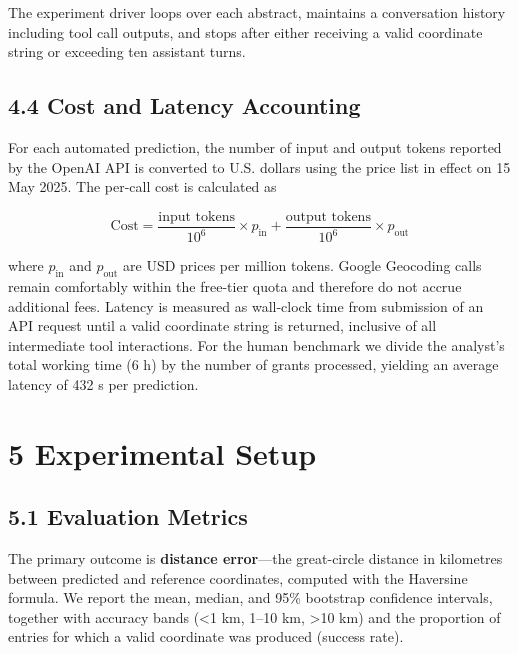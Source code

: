 \documentclass[
  11pt,
]{article}
\begin{document}
The experiment driver loops over each abstract, maintains a conversation
history including tool call outputs, and stops after either receiving a
valid coordinate string or exceeding ten assistant turns.

\subsection{4.4 Cost and Latency
Accounting}\label{cost-and-latency-accounting}

For each automated prediction, the number of input and output tokens
reported by the OpenAI API is converted to U.S. dollars using the price
list in effect on 15 May 2025. The per-call cost is calculated as

\[
\text{Cost} = \frac{\text{input tokens}}{10^{6}} \times p_{\text{in}} + \frac{\text{output tokens}}{10^{6}} \times p_{\text{out}}
\]

where \(p_{\text{in}}\) and \(p_{\text{out}}\) are USD prices per
million tokens. Google Geocoding calls remain comfortably within the
free-tier quota and therefore do not accrue additional fees. Latency is
measured as wall-clock time from submission of an API request until a
valid coordinate string is returned, inclusive of all intermediate tool
interactions. For the human benchmark we divide the analyst's total
working time (6 h) by the number of grants processed, yielding an
average latency of 432 s per prediction.

\section{5 Experimental Setup}\label{experimental-setup}

\subsection{5.1 Evaluation Metrics}\label{evaluation-metrics}

The primary outcome is \textbf{distance error}---the great-circle
distance in kilometres between predicted and reference coordinates,
computed with the Haversine formula. We report the mean, median, and
95\% bootstrap confidence intervals, together with accuracy bands
(\textless1 km, 1--10 km, \textgreater10 km) and the proportion of
entries for which a valid coordinate was produced (success rate).
\end{document}
